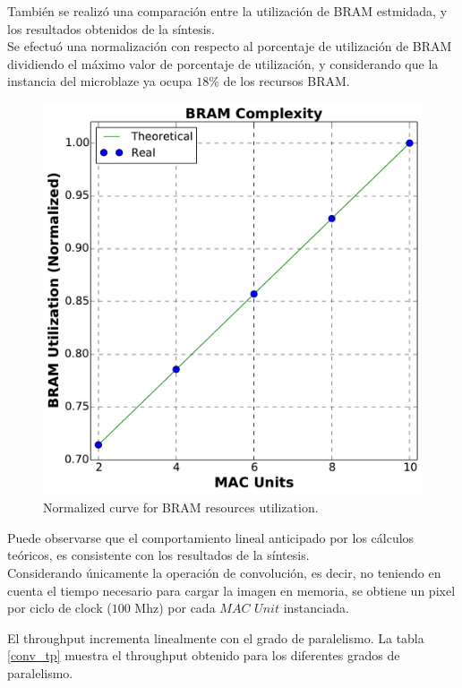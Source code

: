 \documentclass[a4paper]{article}
\begin{document}
También se realizó una comparación entre la utilización de BRAM estmidada, y los resultados
obtenidos de la síntesis.\\

Se efectuó una normalización con respecto al porcentaje de utilización de BRAM dividiendo el máximo
valor de porcentaje de utilización, y considerando que la instancia del microblaze ya ocupa $18\%$
de los recursos BRAM. 
\begin{figure}[H]
\centering
\includegraphics[scale=0.3]{BRAM_c2}
\caption{Normalized curve for BRAM resources utilization.}
\label{bram_n}
\end{figure}

Puede observarse que el comportamiento lineal anticipado por los
cálculos teóricos, es consistente con los resultados de la síntesis.\\


Considerando únicamente la operación de convolución, es decir, no teniendo en cuenta el tiempo
necesario para cargar la imagen en memoria, se obtiene un pixel por ciclo de clock ($100$ Mhz) por
cada $MAC$ $Unit$ instanciada.
\bigskip

El throughput incrementa linealmente con el grado de paralelismo. La tabla \ref{conv_tp} muestra el throughput
obtenido para los diferentes grados de paralelismo.
\end{document}
